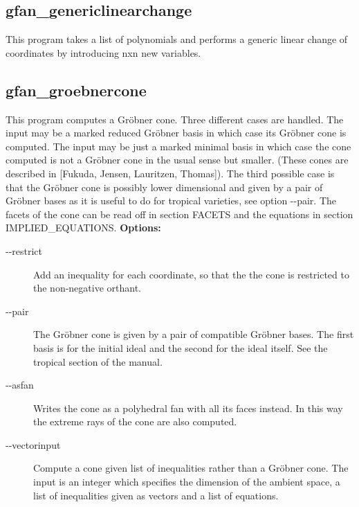 {{{{{{{{{{\subsection{gfan\_genericlinearchange}\label{applist:_genericlinearchange}
This program takes a list of polynomials and performs a generic linear change of coordinates by introducing nxn new variables.


{\subsection{gfan\_groebnercone}\label{applist:_groebnercone}
This program computes a Gr\"obner cone. Three different cases are handled. The input may be a marked reduced Gr\"obner basis in which case its Gr\"obner cone is computed. The input may be just a marked minimal basis in which case the cone computed is not a Gr\"obner cone in the usual sense but smaller. (These cones are described in [Fukuda, Jensen, Lauritzen, Thomas]). The third possible case is that the Gr\"obner cone is possibly lower dimensional and given by a pair of Gr\"obner bases as it is useful to do for tropical varieties, see option -\hspace{0.013cm}-pair. The facets of the cone can be read off in section FACETS and the equations in section IMPLIED\_EQUATIONS.
\newline
{\bf Options:}
\begin{description}
\item[-\hspace{0.013cm}-restrict]Add an inequality for each coordinate, so that the the cone is restricted to the non-negative orthant.\item[-\hspace{0.013cm}-pair]The Gr\"obner cone is given by a pair of compatible Gr\"obner bases. The first basis is for the initial ideal and the second for the ideal itself. See the tropical section of the manual.\item[-\hspace{0.013cm}-asfan]Writes the cone as a polyhedral fan with all its faces instead. In this way the extreme rays of the cone are also computed.\item[-\hspace{0.013cm}-vectorinput]Compute a cone given list of inequalities rather than a Gr\"obner cone. The input is an integer which specifies the dimension of the ambient space, a list of inequalities given as vectors and a list of equations.\end{description}


}}}}}}}}}}}
